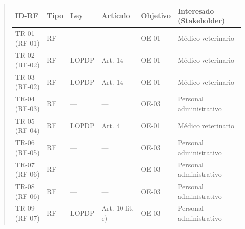\documentclass[
]{article}
\newcounter{none} %
\begin{document}
\begin{quote}
{\def\LTcaptype{none} %
\begin{longtable}[]{|
  >{\centering\arraybackslash}p{}|
  >{\centering\arraybackslash}p{}|
  >{\raggedright\arraybackslash}p{}|
  >{\raggedright\arraybackslash}p{}|
  >{\centering\arraybackslash}p{}|
  >{\raggedright\arraybackslash}p{}|}
\hline
\begin{minipage}[b]{\linewidth}\centering
\textbf{ID-RF}
\end{minipage} & \begin{minipage}[b]{\linewidth}\centering
\textbf{Tipo}
\end{minipage} & \begin{minipage}[b]{\linewidth}\raggedright
\textbf{Ley}
\end{minipage} & \begin{minipage}[b]{\linewidth}\raggedright
\textbf{Artículo}
\end{minipage} & \begin{minipage}[b]{\linewidth}\centering
\textbf{Objetivo}
\end{minipage} & \begin{minipage}[b]{\linewidth}\raggedright
\textbf{Interesado (Stakeholder)}
\end{minipage} \\
\hline
\endhead
\hline
\endlastfoot
TR-01 (RF-01) & RF & — & — & OE-01 & Médico veterinario \\
\hline
TR-02 (RF-02) & RF & LOPDP & Art. 14 & OE-01 & Médico veterinario \\
\hline
TR-03 (RF-02) & RF & LOPDP & Art. 14 & OE-01 & Médico veterinario \\
\hline
TR-04 (RF-03) & RF & — & — & OE-03 & Personal administrativo \\
\hline
TR-05 (RF-04) & RF & LOPDP & Art. 4 & OE-01 & Médico veterinario \\
\hline
TR-06 (RF-05) & RF & — & — & OE-03 & Personal administrativo \\
\hline
TR-07 (RF-06) & RF & — & — & OE-03 & Personal administrativo \\
\hline
TR-08 (RF-06) & RF & — & — & OE-03 & Personal administrativo \\
\hline
TR-09 (RF-07) & RF & LOPDP & Art. 10 lit. e) & OE-03 & Personal administrativo \\

\end{longtable}}
\end{quote}
\end{document}
